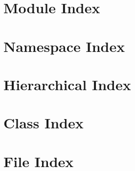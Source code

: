 \documentclass[twoside]{book}
\newcommand{\+}{\discretionary{\mbox{\scriptsize$\hookleftarrow$}}{}{}}
\begin{document}
\chapter{Module Index}

\chapter{Namespace Index}

\chapter{Hierarchical Index}

\chapter{Class Index}

\chapter{File Index}

\end{document}
